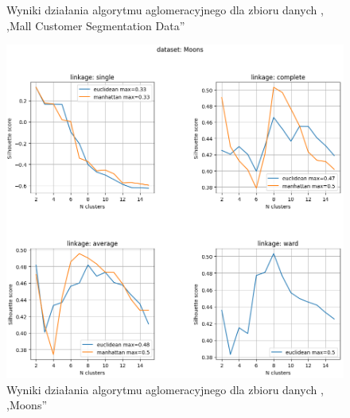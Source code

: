 \documentclass{classrep}
\begin{document}
{{\begin{figure}[h]
                \caption{Wyniki działania algorytmu aglomeracyjnego dla zbioru danych ,
                ,Mall Customer Segmentation Data''}
                \label{fig:agglomerative_customers}
            \end{figure}
            \begin{figure}[h]
                \centering
                \includegraphics[width=1\textwidth]{img/mum_agglomerative_moons.png}
                \caption{Wyniki działania algorytmu aglomeracyjnego dla zbioru danych ,
                ,Moons''}
                \label{fig:agglomerative_moons}
            \end{figure}
            \FloatBarrier
        }
        \newpage

}
\end{document}
